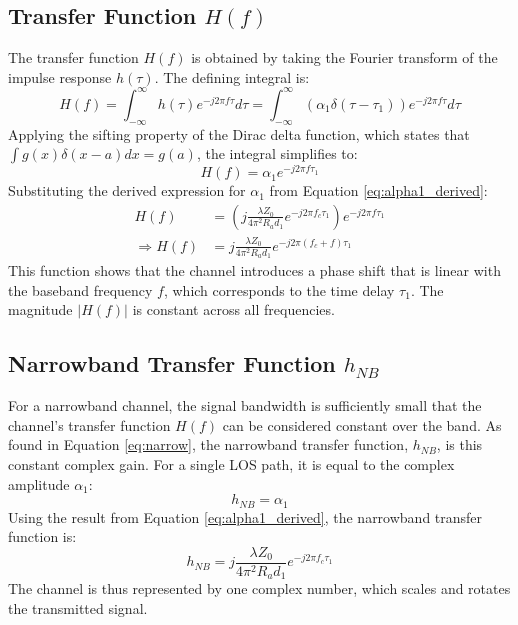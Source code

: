 \subsection{Transfer Function $H(f)$}
The transfer function $H(f)$ is obtained by taking the Fourier transform of the impulse response $h(\tau)$. The defining integral is:
\begin{equation}
	H(f) = \int_{-\infty}^{\infty} h(\tau) e^{-j2\pi f \tau} d\tau = \int_{-\infty}^{\infty} \left( \alpha_1 \delta(\tau - \tau_1) \right) e^{-j2\pi f \tau} d\tau
\end{equation}
Applying the sifting property of the Dirac delta function, which states that $\int g(x)\delta(x-a)dx = g(a)$, the integral simplifies to:
\begin{equation}
	H(f) = \alpha_1 e^{-j2\pi f \tau_1}
\end{equation}
Substituting the derived expression for $\alpha_1$ from Equation \ref{eq:alpha1_derived}:
\begin{align}
	H(f) &= \left( j \frac{\lambda Z_0}{4\pi^2 R_a d_1} e^{-j2\pi f_c \tau_1} \right) e^{-j2\pi f \tau_1} \\
	\Rightarrow H(f) &= j \frac{\lambda Z_0}{4\pi^2 R_a d_1} e^{-j2\pi (f_c + f) \tau_1}
	\label{eq:los_transfer_function_detailed}
\end{align}
This function shows that the channel introduces a phase shift that is linear with the baseband frequency $f$, which corresponds to the time delay $\tau_1$. The magnitude $|H(f)|$ is constant across all frequencies.

\subsection{Narrowband Transfer Function $h_{NB}$}
For a narrowband channel, the signal bandwidth is sufficiently small that the channel's transfer function $H(f)$ can be considered constant over the band. As found in Equation \ref{eq:narrow}, the narrowband transfer function, $h_{NB}$, is this constant complex gain. For a single LOS path, it is equal to the complex amplitude $\alpha_1$:
\begin{equation}
	h_{NB} = \alpha_1
\end{equation}
Using the result from Equation \ref{eq:alpha1_derived}, the narrowband transfer function is:
\begin{equation}
	h_{NB} = j \frac{\lambda Z_0}{4\pi^2 R_a d_1} e^{-j2\pi f_c \tau_1}
	\label{eq:los_narrowband_tf_detailed}
\end{equation}
The channel is thus represented by one complex number, which scales and rotates the transmitted signal.

